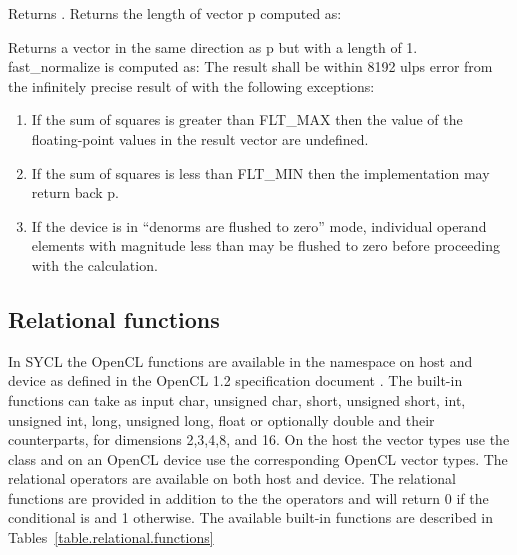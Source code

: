 {
Returns .
}
{
Returns the length of vector p computed as:
}
{
Returns a vector in the same direction as p but with a
length of 1. fast_normalize is computed as:
\newline
The result shall be within 8192 ulps error from the
infinitely precise result of
\newline
{}\newline
{}\newline
{}\newline
with the following exceptions:
\begin{enumerate}
\item If the sum of squares is greater than FLT\_MAX
then the value of the floating-point values in the
result vector are undefined.

\item If the sum of squares is less than FLT\_MIN then
the implementation may return back p.

\item If the device is in ``denorms are flushed to zero''
mode, individual operand elements with magnitude
less than  may be flushed to zero
before proceeding with the calculation.
\end{enumerate}
}
\completeTable

\subsection{Relational functions}

In SYCL the OpenCL  functions are available in the namespace
 on host and device as defined in the OpenCL 1.2 specification
document \cite[par. 6.12.6]{opencl12}. The built-in functions can take as input
char, unsigned char, short, unsigned short, int, unsigned int, long, unsigned
long, float or optionally double and their  counterparts, for
dimensions 2,3,4,8, and 16. On the host the vector types use
the  class and on an OpenCL device use the
corresponding OpenCL vector types.
The relational operators are available on both host and device.  The
relational functions are provided in addition to the the operators and will
return 0 if the conditional
is  and 1 otherwise.
The available built-in functions are described in
Tables~\ref{table.relational.functions}

